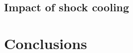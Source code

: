 \documentclass[fleqn,usenatbib]{mnras}
\begin{document}
\subsection{Impact of shock cooling}

\section{Conclusions}





\bsp	%
\label{lastpage}
\end{document}
